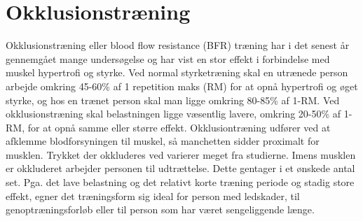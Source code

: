 \section{Okklusionstræning}
Okklusionstræning eller blood flow resistance (BFR) træning har i det senest år gennemgået mange undersøgelse og har vist en stor effekt i forbindelse med muskel hypertrofi og styrke. Ved normal styrketræning skal en utrænede person arbejde omkring 45-60\% af 1 repetition maks (RM) for at opnå hypertrofi og øget styrke, og hos en trænet person skal man ligge omkring 80-85\% af 1-RM. Ved okklusionstræning skal belastningen ligge væsentlig lavere, omkring 20-50\% af 1-RM, for at opnå samme eller større effekt. 
Okklusiontræning udfører ved at afklemme blodforsyningen til muskel, så manchetten sidder proximalt for musklen. Trykket der okkluderes ved varierer meget fra studierne. Imens musklen er okkluderet arbejder personen til udtrættelse. Dette gentager i et ønskede antal set. 
Pga. det lave belastning og det relativt korte træning periode og stadig store effekt, egner det træningsform sig ideal for person med ledskader, til genoptræningsforløb eller til person som har været sengeliggende længe. 









